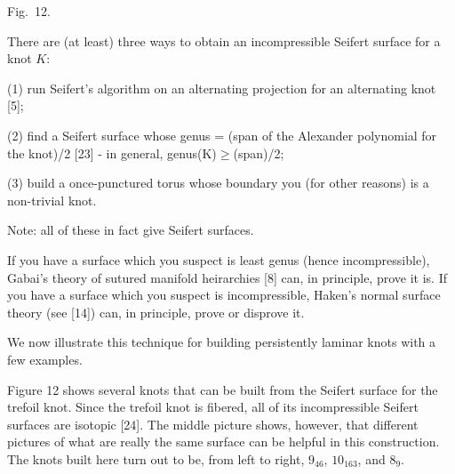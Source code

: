 \leavevmode

\epsfxsize=4.5in
\centerline{{}}

\centerline{\eightrm Fig.~12.}

\smallskip

There are (at least) three ways to obtain an incompressible Seifert 
surface for a knot $K$:

\ssk

\noindent (1) run Seifert's algorithm on an alternating projection 
for an alternating knot [5];

\ssk

\noindent (2) find a Seifert surface whose genus = 
(span of the Alexander polynomial for the 
knot)/2 [23] - in general, 
genus(K)$\geq$(span)/2;

\ssk

\noindent (3) build a once-punctured torus whose boundary you 
 (for other reasons) is a non-trivial knot.

\msk

Note: all of these in fact give   Seifert 
surfaces.

\smallskip

If you have a surface which you suspect is least genus (hence 
incompressible), Gabai's theory of sutured manifold heirarchies [8] 
can, in principle, prove it is. If you have a surface which you 
suspect is incompressible, Haken's normal surface theory (see [14]) 
can, in principle, prove or disprove it.

\smallskip



We now illustrate this technique for building persistently 
laminar knots with a few examples.


Figure 12 shows several knots that can be built from the Seifert
surface for the trefoil knot. Since the trefoil knot is fibered, 
all of its incompressible Seifert surfaces are isotopic [24]. The
middle picture shows, however, that different pictures of what 
are really the same surface can be helpful in this construction.
The knots built here turn out to be, from left to right, $9_{46}$, $10_{163}$, 
and $8_9$.

\smallskip

\leavevmode

\epsfxsize=4.9in

\centerline{{}}


\smallskip


